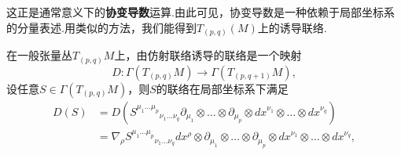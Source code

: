 		这正是通常意义下的\textbf{协变导数}运算.由此可见，协变导数是一种依赖于局部坐标系的分量表述.用类似的方法，我们能得到$T_{(p,q)}(M)$上的诱导联络.
		\begin{definition}在一般张量丛$T_{(p,q)}M$上，由仿射联络诱导的联络是一个映射
			$$D:\varGamma(T_{(p,q)}M)\rightarrow\varGamma(T_{(p,q+1)}M),$$
			设任意$S\in \varGamma(T_{(p,q)}M)$，则$S$的联络在局部坐标系下满足
			\begin{equation}
				\begin{split}
					D(S)&=D({S^{\mu_1\dots\mu_p}}_{\nu_1\dots\nu_q}\partial_{\mu_1}\otimes\dots\otimes\partial_{\mu_p}\otimes{dx}^{\nu_1}\otimes\dots\otimes{dx}^{\nu_q})\\
				&=\nabla_{\rho}{S^{\mu_1\dots\mu_p}}_{\nu_1\dots\nu_q}dx^\rho\otimes\partial_{\mu_1}\otimes\dots\otimes\partial_{\mu_p}\otimes{dx}^{\nu_1}\otimes\dots\otimes{dx}^{\nu_q},
				\end{split}

\end{equation}
\end{definition}
